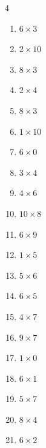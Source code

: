 \begin{multicols}{4}
\begin{enumerate}
  \item $6\times 3$
        \phantom{$=18$}

  \item $2\times 10$
        \phantom{$=20$}

  \item $8\times 3$
        \phantom{$=24$}

  \item $2\times 4$
        \phantom{$=8$}

  \item $8\times 3$
        \phantom{$=24$}

  \item $1\times 10$
        \phantom{$=10$}

  \item $6\times 0$
        \phantom{$=0$}

  \item $3\times 4$
        \phantom{$=12$}

  \item $4\times 6$
        \phantom{$=24$}

  \item $10\times 8$
        \phantom{$=80$}

  \item $6\times 9$
        \phantom{$=54$}

\columnbreak %

  \item $1\times 5$
        \phantom{$=5$}

  \item $5\times 6$
        \phantom{$=30$}

  \item $6\times 5$
        \phantom{$=30$}

  \item $4\times 7$
        \phantom{$=28$}

  \item $9\times 7$
        \phantom{$=63$}

  \item $1\times 0$
        \phantom{$=0$}

  \item $6\times 1$
        \phantom{$=6$}

  \item $5\times 7$
        \phantom{$=35$}

  \item $8\times 4$
        \phantom{$=32$}

  \item $6\times 2$
        \phantom{$=12$}


\end{enumerate}
\end{multicols}
